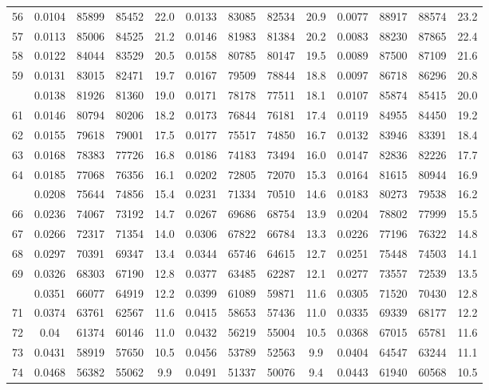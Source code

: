 \documentclass[
  14pt,
]{article}
\begin{document}
\begin{longtable}[t]{lcccccccccccc}
56 & 0.0104 & 85899 & 85452 & 22.0 & 0.0133 & 83085 & 82534 & 20.9 & 0.0077 & 88917 & 88574 & 23.2\\
57 & 0.0113 & 85006 & 84525 & 21.2 & 0.0146 & 81983 & 81384 & 20.2 & 0.0083 & 88230 & 87865 & 22.4\\
58 & 0.0122 & 84044 & 83529 & 20.5 & 0.0158 & 80785 & 80147 & 19.5 & 0.0089 & 87500 & 87109 & 21.6\\
59 & 0.0131 & 83015 & 82471 & 19.7 & 0.0167 & 79509 & 78844 & 18.8 & 0.0097 & 86718 & 86296 & 20.8\\
\addlinespace
60 & 0.0138 & 81926 & 81360 & 19.0 & 0.0171 & 78178 & 77511 & 18.1 & 0.0107 & 85874 & 85415 & 20.0\\
61 & 0.0146 & 80794 & 80206 & 18.2 & 0.0173 & 76844 & 76181 & 17.4 & 0.0119 & 84955 & 84450 & 19.2\\
62 & 0.0155 & 79618 & 79001 & 17.5 & 0.0177 & 75517 & 74850 & 16.7 & 0.0132 & 83946 & 83391 & 18.4\\
63 & 0.0168 & 78383 & 77726 & 16.8 & 0.0186 & 74183 & 73494 & 16.0 & 0.0147 & 82836 & 82226 & 17.7\\
64 & 0.0185 & 77068 & 76356 & 16.1 & 0.0202 & 72805 & 72070 & 15.3 & 0.0164 & 81615 & 80944 & 16.9\\
\addlinespace
65 & 0.0208 & 75644 & 74856 & 15.4 & 0.0231 & 71334 & 70510 & 14.6 & 0.0183 & 80273 & 79538 & 16.2\\
66 & 0.0236 & 74067 & 73192 & 14.7 & 0.0267 & 69686 & 68754 & 13.9 & 0.0204 & 78802 & 77999 & 15.5\\
67 & 0.0266 & 72317 & 71354 & 14.0 & 0.0306 & 67822 & 66784 & 13.3 & 0.0226 & 77196 & 76322 & 14.8\\
68 & 0.0297 & 70391 & 69347 & 13.4 & 0.0344 & 65746 & 64615 & 12.7 & 0.0251 & 75448 & 74503 & 14.1\\
69 & 0.0326 & 68303 & 67190 & 12.8 & 0.0377 & 63485 & 62287 & 12.1 & 0.0277 & 73557 & 72539 & 13.5\\
\addlinespace
70 & 0.0351 & 66077 & 64919 & 12.2 & 0.0399 & 61089 & 59871 & 11.6 & 0.0305 & 71520 & 70430 & 12.8\\
71 & 0.0374 & 63761 & 62567 & 11.6 & 0.0415 & 58653 & 57436 & 11.0 & 0.0335 & 69339 & 68177 & 12.2\\
72 & 0.04 & 61374 & 60146 & 11.0 & 0.0432 & 56219 & 55004 & 10.5 & 0.0368 & 67015 & 65781 & 11.6\\
73 & 0.0431 & 58919 & 57650 & 10.5 & 0.0456 & 53789 & 52563 & 9.9 & 0.0404 & 64547 & 63244 & 11.1\\
74 & 0.0468 & 56382 & 55062 & 9.9 & 0.0491 & 51337 & 50076 & 9.4 & 0.0443 & 61940 & 60568 & 10.5\\

\end{longtable}
\end{document}

